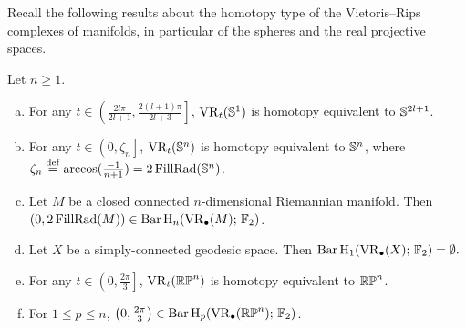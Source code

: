 Recall the following results about the homotopy type of the Vietoris--Rips complexes of manifolds, in particular of the spheres and the real projective spaces. 
\begin{proposition}\label{prop:homotopy type} 
Let $n\geq 1$.
\begin{enumerate}[(a)]
    \item\label{prop:S1} For any $ t\in \left(\frac{2l\pi}{2l+1},\frac{2(l+1)\pi}{2l+3}\right]$, $\operatorname{VR}_t(\mathbb{S}^1)$ is homotopy equivalent to $\mathbb{S}^{2l+1}$. 
    \item\label{prop:Sn} For any $ t\in \left(0,\zeta_n\right]$, $\operatorname{VR}_t(\mathbb{S}^n)$ is homotopy equivalent to $\mathbb{S}^n$, where $\zeta_n\stackrel{\mathrm{def}}{=}\arccos(\frac{-1}{n+1})=2\operatorname{FillRad}(\mathbb{S}^n)$. 
    \item\label{prop:manifold} Let $M$ be a closed connected $n$-dimensional Riemannian manifold. Then $(0,2\operatorname{FillRad}(M))\in \operatorname{Bar} \operatorname{H}_{n}(\operatorname{VR}_\bullet(M);\,{\mathbb{F}_2})$.
    \item\label{prop:pH1} Let $X$ be a simply-connected geodesic space. Then $\operatorname{Bar} \operatorname{H}_{1}(\operatorname{VR}_\bullet(X);\,{\mathbb{F}_2})=\emptyset.$
    \item\label{prop:RPn} For any $ t\in \left(0,\frac{2\pi}{3} \right]$, $\operatorname{VR}_t(\mathbb{RP}^n)$ is homotopy equivalent to $\mathbb{RP}^n$. 
    \item\label{prop:RPn bar}For $1\leq p\leq n$, $\left(0, \frac{2\pi}{3}\right)\in\operatorname{Bar} \operatorname{H}_{p}(\operatorname{VR}_\bullet(\mathbb{RP}^n);\,{\mathbb{F}_2})$.
\end{enumerate}
\end{proposition}

